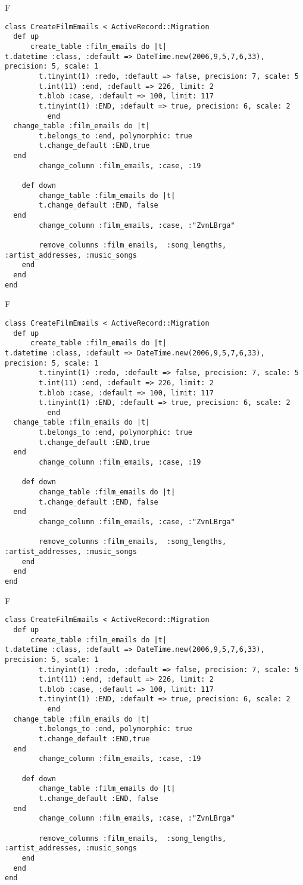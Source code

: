 F
\begin{verbatim}
class CreateFilmEmails < ActiveRecord::Migration
  def up
	  create_table :film_emails do |t|
t.datetime :class, :default => DateTime.new(2006,9,5,7,6,33), precision: 5, scale: 1
		t.tinyint(1) :redo, :default => false, precision: 7, scale: 5
		t.int(11) :end, :default => 226, limit: 2
		t.blob :case, :default => 100, limit: 117
		t.tinyint(1) :END, :default => true, precision: 6, scale: 2
		  end
  change_table :film_emails do |t|
		t.belongs_to :end, polymorphic: true
 		t.change_default :END,true
  end
 		change_column :film_emails, :case, :19
   
	def down
		change_table :film_emails do |t|
		t.change_default :END, false
  end
 		change_column :film_emails, :case, :"ZvnLBrga"
   
		remove_columns :film_emails,  :song_lengths, :artist_addresses, :music_songs 
    end 
  end
end

\end{verbatim}

F
\begin{verbatim}
class CreateFilmEmails < ActiveRecord::Migration
  def up
	  create_table :film_emails do |t|
t.datetime :class, :default => DateTime.new(2006,9,5,7,6,33), precision: 5, scale: 1
		t.tinyint(1) :redo, :default => false, precision: 7, scale: 5
		t.int(11) :end, :default => 226, limit: 2
		t.blob :case, :default => 100, limit: 117
		t.tinyint(1) :END, :default => true, precision: 6, scale: 2
		  end
  change_table :film_emails do |t|
		t.belongs_to :end, polymorphic: true
 		t.change_default :END,true
  end
 		change_column :film_emails, :case, :19
   
	def down
		change_table :film_emails do |t|
		t.change_default :END, false
  end
 		change_column :film_emails, :case, :"ZvnLBrga"
   
		remove_columns :film_emails,  :song_lengths, :artist_addresses, :music_songs 
    end 
  end
end

\end{verbatim}

F
\begin{verbatim}
class CreateFilmEmails < ActiveRecord::Migration
  def up
	  create_table :film_emails do |t|
t.datetime :class, :default => DateTime.new(2006,9,5,7,6,33), precision: 5, scale: 1
		t.tinyint(1) :redo, :default => false, precision: 7, scale: 5
		t.int(11) :end, :default => 226, limit: 2
		t.blob :case, :default => 100, limit: 117
		t.tinyint(1) :END, :default => true, precision: 6, scale: 2
		  end
  change_table :film_emails do |t|
		t.belongs_to :end, polymorphic: true
 		t.change_default :END,true
  end
 		change_column :film_emails, :case, :19
   
	def down
		change_table :film_emails do |t|
		t.change_default :END, false
  end
 		change_column :film_emails, :case, :"ZvnLBrga"
   
		remove_columns :film_emails,  :song_lengths, :artist_addresses, :music_songs 
    end 
  end
end

\end{verbatim}

